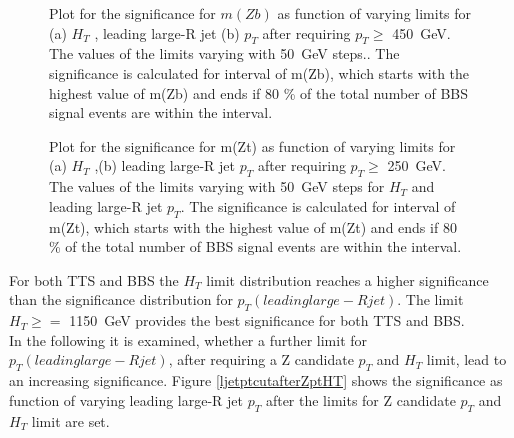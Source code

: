 \begin{figure}[h]
    \centering
    \caption{Plot for the significance for $m(Zb)$ as function of varying limits for (a) $H_{T}$ , leading large-R jet (b)  $p_{T}$ after requiring $p_{T} \geq$ \SI{450}{GeV}.
    The values of the limits varying with \SI{50}{GeV} steps..
    The significance is calculated for interval of m(Zb), which starts with the highest value of m(Zb) and ends if 80 \% of the total number of BBS signal events are within the interval.}
    \label{mZbcutafterZpt}   
\end{figure}


\begin{figure}[h]
    \centering
    \caption{Plot for the significance for m(Zt) as function of varying limits for (a) $H_{T}$ ,(b) leading large-R jet $p_{T}$  after requiring $p_{T} \geq$ \SI{250}{GeV}.
    The values of the limits varying with \SI{50}{GeV} steps for $H_{T}$ and leading large-R jet $p_{T}$.
    The significance is calculated for interval of m(Zt), which starts with the highest value of m(Zt) and ends if 80 \% of the total number of BBS signal events are within the interval.}
    \label{mZtcutafterZpt}   
\end{figure}

For both TTS and BBS the $H_{T}$ limit distribution reaches a higher significance than the significance distribution for  $p_{T}(leading large-R jet)$.
The limit $H_ {T} \geq =$ \SI{1150}{GeV} provides the best significance for both TTS and BBS.\\
In the following it is examined, whether a further limit for $p_{T}(leading large-R jet)$, after requiring a Z candidate $p_{T}$ and $H_{T}$ limit, lead to an increasing significance.
Figure \ref{ljetptcutafterZptHT} shows the significance as function of varying leading large-R jet $p_{T}$ after the limits for Z candidate $p_{T}$ and $H_{T}$ limit are set.

